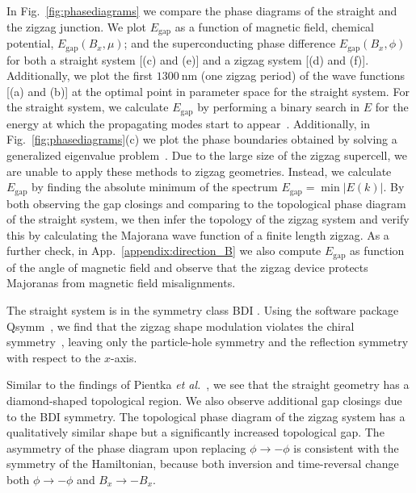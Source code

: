 \documentclass[english, twocolumn, 10pt, aps, superscriptaddress, floatfix, prb, citeautoscript]{revtex4-1}
\renewcommand{\comment}[2]{#2}
\begin{document}
\comment{We calculate the topological phase diagram.}
In Fig.~\ref{fig:phasediagrams} we compare the phase diagrams of the straight and the zigzag junction.
We plot $E_\textrm{gap}$ as a function of magnetic field, chemical potential, $E_\textrm{gap}(B_x, \mu)$; and the superconducting phase difference $E_\textrm{gap}(B_x, \phi)$ for both a straight system [(c) and (e)] and a zigzag system [(d) and (f)].
Additionally, we plot the first $\SI{1300}{\nm}$ (one zigzag period) of the wave functions [(a) and (b)] at the optimal point in parameter space for the straight system.
For the straight system, we calculate $E_\textrm{gap}$ by performing a binary search in $E$ for the energy at which the propagating modes start to appear~\cite{Nijholt2016}.
Additionally, in Fig.~\ref{fig:phasediagrams}(c) we plot the phase boundaries obtained by solving a generalized eigenvalue problem~\cite{Nijholt2016}.
Due to the large size of the zigzag supercell, we are unable to apply these methods to zigzag geometries.
Instead, we calculate $E_\textrm{gap}$ by finding the absolute minimum of the spectrum $E_\textrm{gap}=\min{\left|E(k)\right|}$.
By both observing the gap closings and comparing to the topological phase diagram of the straight system, we then infer the topology of the zigzag system and verify this by calculating the Majorana wave function of a finite length zigzag.
As a further check, in App.~\ref{appendix:direction_B} we also compute $E_\textrm{gap}$ as function of the angle of magnetic field and observe that the zigzag device protects Majoranas from magnetic field misalignments.

\comment{The introduction of a the zigzag breaks a chiral symmetry, bringing the system from the BDI to the D symmetry class}
The straight system is in the symmetry class BDI \cite{Pientka2017}.
Using the software package Qsymm~\cite{Varjas2018}, we find that the zigzag shape modulation violates the chiral symmetry~\cite{Setiawan2019}, leaving only the particle-hole symmetry and the reflection symmetry with respect to the $x$-axis.

\comment{The phase diagram does not change much, except we see a cleaner spectrum as a result of the D class symmetry.}
Similar to the findings of Pientka \textit{et al.}~\cite{Pientka2017}, we see that the straight geometry has a diamond-shaped topological region.
We also observe additional gap closings due to the BDI symmetry.
The topological phase diagram of the zigzag system has a qualitatively similar shape but a significantly increased topological gap.
The asymmetry of the phase diagram upon replacing $\phi \rightarrow -\phi$ is consistent with the symmetry of the Hamiltonian, because both inversion and time-reversal change both $\phi \rightarrow -\phi$ and $B_x \rightarrow -B_x$.
\end{document}
